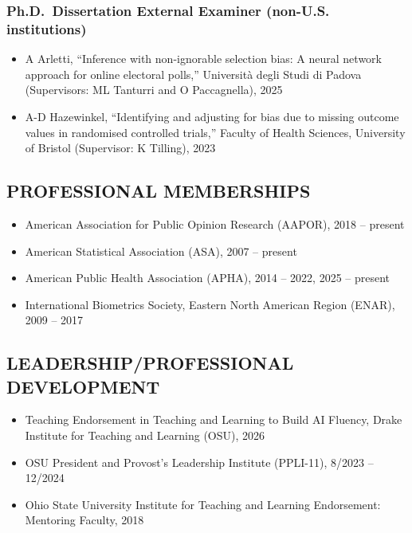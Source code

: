 \documentclass[
  english,
  letterpaper,
  DIV=11,
  numbers=noendperiod]{scrartcl}
\providecommand{\tightlist}{%
  \setlength{\itemsep}{0pt}\setlength{\parskip}{0pt}}
\begin{document}
\subsubsection{Ph.D.~Dissertation External Examiner (non-U.S.
institutions)}\label{ph.d.-dissertation-external-examiner-non-u.s.-institutions}

\begin{itemize}
\tightlist
\item
  A Arletti, ``Inference with non-ignorable selection bias: A neural
  network approach for online electoral polls,'' Università degli Studi
  di Padova (Supervisors: ML Tanturri and O Paccagnella), 2025
\item
  A-D Hazewinkel, ``Identifying and adjusting for bias due to missing
  outcome values in randomised controlled trials,'' Faculty of Health
  Sciences, University of Bristol (Supervisor: K Tilling), 2023
\end{itemize}

\subsection{PROFESSIONAL MEMBERSHIPS}\label{professional-memberships}

\begin{itemize}
\tightlist
\item
  American Association for Public Opinion Research (AAPOR), 2018 --
  present
\item
  American Statistical Association (ASA), 2007 -- present
\item
  American Public Health Association (APHA), 2014 -- 2022, 2025 --
  present
\item
  International Biometrics Society, Eastern North American Region
  (ENAR), 2009 -- 2017
\end{itemize}

\subsection{LEADERSHIP/PROFESSIONAL
DEVELOPMENT}\label{leadershipprofessional-development}

\begin{itemize}
\tightlist
\item
  Teaching Endorsement in Teaching and Learning to Build AI Fluency,
  Drake Institute for Teaching and Learning (OSU), 2026
\item
  OSU President and Provost's Leadership Institute (PPLI-11), 8/2023 --
  12/2024
\item
  Ohio State University Institute for Teaching and Learning Endorsement:
  Mentoring Faculty, 2018
\end{itemize}
\end{document}
